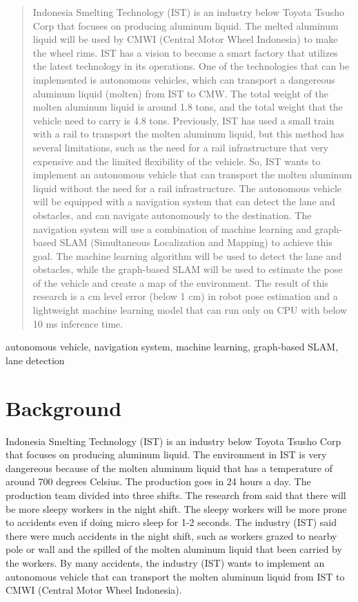 \documentclass[conference]{IEEEtran}
\begin{document}
\begin{abstract}
	Indonesia Smelting Technology (IST) is an industry below Toyota Tsusho Corp that focuses on producing aluminum liquid. The melted aluminum liquid will be used by CMWI (Central Motor Wheel Indonesia) to make the wheel rims. IST has a vision to become a smart factory that utilizes the latest technology in its operations. One of the technologies that can be implemented is autonomous vehicles, which can transport a dangereous aluminum liquid (molten) from IST to CMW. The total weight of the molten aluminum liquid is around 1.8 tons, and the total weight that the vehicle need to carry is 4.8 tons. Previously, IST has used a small train with a rail to transport the molten aluminum liquid, but this method has several limitations, such as the need for a rail infrastructure that very expensive and the limited flexibility of the vehicle. So, IST wants to implement an autonomous vehicle that can transport the molten aluminum liquid without the need for a rail infrastructure. The autonomous vehicle will be equipped with a navigation system that can detect the lane and obstacles, and can navigate autonomously to the destination. The navigation system will use a combination of machine learning and graph-based SLAM (Simultaneous Localization and Mapping) to achieve this goal. The machine learning algorithm will be used to detect the lane and obstacles, while the graph-based SLAM will be used to estimate the pose of the vehicle and create a map of the environment. The result of this research is a cm level error (below 1 cm) in robot pose estimation and a lightweight machine learning model that can run only on CPU with below 10 ms inference time.
\end{abstract}

\begin{IEEEkeywords}
	autonomous vehicle, navigation system, machine learning, graph-based SLAM, lane detection
\end{IEEEkeywords}

\section{Background}
Indonesia Smelting Technology (IST) is an industry below Toyota Tsusho Corp that focuses on producing aluminum liquid. The environment in IST is very dangereous because of the molten aluminum liquid that has a temperature of around 700 degrees Celsius. The production goes in 24 hours a day. The production team divided into three shifts. The research from \cite{ref_sleep} said that there will be more sleepy workers in the night shift. The sleepy workers will be more prone to accidents even if doing micro sleep for 1-2 seconds. The industry (IST) said there were much accidents in the night shift, such as workers grazed to nearby pole or wall and the spilled of the molten aluminum liquid that been carried by the workers. By many accidents, the industry (IST) wants to implement an autonomous vehicle that can transport the molten aluminum liquid from IST to CMWI (Central Motor Wheel Indonesia). 
\end{document}

